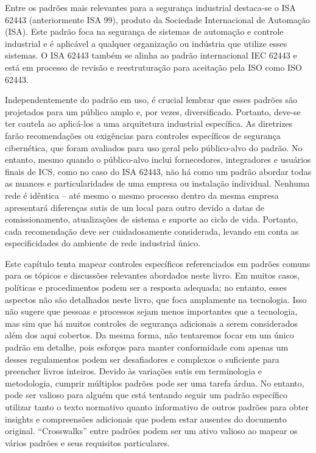 Entre os padrões mais relevantes para a segurança industrial destaca-se o ISA 62443 (anteriormente ISA 99), produto da Sociedade Internacional de Automação (ISA). Este padrão foca na segurança de sistemas de automação e controle industrial e é aplicável a qualquer organização ou indústria que utilize esses sistemas. O ISA 62443 também se alinha ao padrão internacional IEC 62443 e está em processo de revisão e reestruturação para aceitação pela ISO como ISO 62443.

Independentemente do padrão em uso, é crucial lembrar que esses padrões são projetados para um público amplo e, por vezes, diversificado. Portanto, deve-se ter cautela ao aplicá-los a uma arquitetura industrial específica. As diretrizes farão recomendações ou exigências para controles específicos de segurança cibernética, que foram avaliados para uso geral pelo público-alvo do padrão. No entanto, mesmo quando o público-alvo inclui fornecedores, integradores e usuários finais de ICS, como no caso do ISA 62443, não há como um padrão abordar todas as nuances e particularidades de uma empresa ou instalação individual. Nenhuma rede é idêntica – até mesmo o mesmo processo dentro da mesma empresa apresentará diferenças sutis de um local para outro devido a datas de comissionamento, atualizações de sistema e suporte ao ciclo de vida. Portanto, cada recomendação deve ser cuidadosamente considerada, levando em conta as especificidades do ambiente de rede industrial único.

Este capítulo tenta mapear controles específicos referenciados em padrões comuns para os tópicos e discussões relevantes abordados neste livro. Em muitos casos, políticas e procedimentos podem ser a resposta adequada; no entanto, esses aspectos não são detalhados neste livro, que foca amplamente na tecnologia. Isso não sugere que pessoas e processos sejam menos importantes que a tecnologia, mas sim que há muitos controles de segurança adicionais a serem considerados além dos aqui cobertos. Da mesma forma, não tentaremos focar em um único padrão em detalhe, pois esforços para manter conformidade com apenas um desses regulamentos podem ser desafiadores e complexos o suficiente para preencher livros inteiros. Devido às variações sutis em terminologia e metodologia, cumprir múltiplos padrões pode ser uma tarefa árdua. No entanto, pode ser valioso para alguém que está tentando seguir um padrão específico utilizar tanto o texto normativo quanto informativo de outros padrões para obter insights e compreensões adicionais que podem estar ausentes do documento original. ``Crosswalks'' entre padrões podem ser um ativo valioso ao mapear os vários padrões e seus requisitos particulares.

